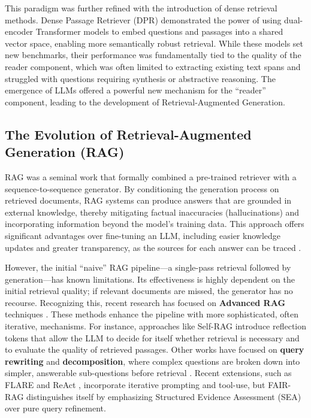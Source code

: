 \documentclass[11pt]{article}
\begin{document}
This paradigm was further refined with the introduction of dense retrieval methods. Dense Passage Retriever (DPR) \cite{karpukhin2020dense} demonstrated the power of using dual-encoder Transformer models to embed questions and passages into a shared vector space, enabling more semantically robust retrieval. While these models set new benchmarks, their performance was fundamentally tied to the quality of the reader component, which was often limited to extracting existing text spans and struggled with questions requiring synthesis or abstractive reasoning. The emergence of LLMs offered a powerful new mechanism for the ``reader'' component, leading to the development of Retrieval-Augmented Generation.

\subsection{The Evolution of Retrieval-Augmented Generation (RAG)}

RAG \cite{lewis2020retrieval} was a seminal work that formally combined a pre-trained retriever with a sequence-to-sequence generator. By conditioning the generation process on retrieved documents, RAG systems can produce answers that are grounded in external knowledge, \cite{komeili2022internet} thereby mitigating factual inaccuracies (hallucinations) and incorporating information beyond the model's training data. This approach offers significant advantages over fine-tuning an LLM, including easier knowledge updates and greater transparency, as the sources for each answer can be traced \cite{gao2023retrieval}.

However, the initial ``naive'' RAG pipeline---a single-pass retrieval followed by generation---has known limitations. Its effectiveness is highly dependent on the initial retrieval quality; if relevant documents are missed, the generator has no recourse. Recognizing this, recent research has focused on \textbf{Advanced RAG} techniques \cite{gao2023retrieval, asai2023self}. These methods enhance the pipeline with more sophisticated, often iterative, mechanisms. For instance, approaches like Self-RAG \cite{asai2023self} introduce reflection tokens that allow the LLM to decide for itself whether retrieval is necessary and to evaluate the quality of retrieved passages. Other works have focused on \textbf{query rewriting} and \textbf{decomposition}, where complex questions are broken down into simpler, answerable sub-questions before retrieval \cite{jiang2023query}. Recent extensions, such as FLARE \cite{jiang2023flare} and ReAct \cite{yao2022react}, incorporate iterative prompting and tool-use, but FAIR-RAG distinguishes itself by emphasizing Structured Evidence Assessment (SEA) over pure query refinement.
\end{document}
